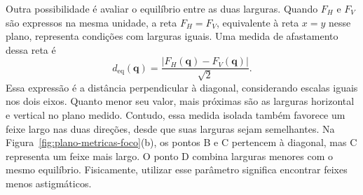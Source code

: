 \documentclass[12pt,a4paper]{article}
\begin{document}
Outra possibilidade é avaliar o equilíbrio entre as duas larguras. Quando $F_H$ e $F_V$ são expressos na mesma unidade, a reta $F_H=F_V$, equivalente à reta $x=y$ nesse plano, representa condições com larguras iguais. Uma medida de afastamento dessa reta é
\begin{equation}
    d_{\mathrm{eq}}(\mathbf{q})=
    \frac{|F_H(\mathbf{q})-F_V(\mathbf{q})|}{\sqrt{2}}.
    \label{eq:distancia-equilibrio}
\end{equation}
Essa expressão é a distância perpendicular à diagonal, considerando escalas iguais nos dois eixos. Quanto menor seu valor, mais próximas são as larguras horizontal e vertical no plano medido. Contudo, essa medida isolada também favorece um feixe largo nas duas direções, desde que suas larguras sejam semelhantes. Na Figura~\ref{fig:plano-metricas-foco}(b), os pontos B e C pertencem à diagonal, mas C representa um feixe mais largo. O ponto D combina larguras menores com o mesmo equilíbrio. 
Fisicamente, utilizar esse parâmetro significa encontrar feixes menos astigmáticos.
\end{document}
